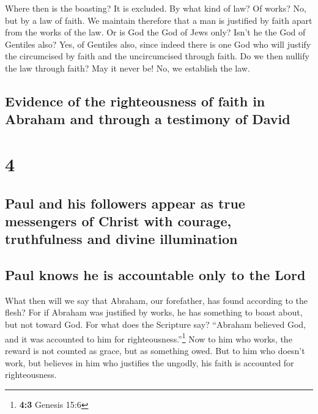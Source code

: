  Where then is the boasting? It is excluded. By what kind
of law? Of works? No, but by a law of faith.  We maintain
therefore that a man is justified by faith apart from the works of the
law.  Or is God the God of Jews only? Isn't he the God of
Gentiles also? Yes, of Gentiles also,  since indeed there
is one God who will justify the circumcised by faith and the
uncircumcised through faith.  Do we then nullify the law
through faith? May it never be! No, we establish the law.

\hypertarget{evidence-of-the-righteousness-of-faith-in-abraham-and-through-a-testimony-of-david}{%
\subsection{Evidence of the righteousness of faith in Abraham and
through a testimony of
David}\label{evidence-of-the-righteousness-of-faith-in-abraham-and-through-a-testimony-of-david}}

\hypertarget{section-3}{%
\section{4}\label{section-3}}

\hypertarget{paul-and-his-followers-appear-as-true-messengers-of-christ-with-courage-truthfulness-and-divine-illumination}{%
\subsection{Paul and his followers appear as true messengers of Christ
with courage, truthfulness and divine
illumination}\label{paul-and-his-followers-appear-as-true-messengers-of-christ-with-courage-truthfulness-and-divine-illumination}}

\hypertarget{paul-knows-he-is-accountable-only-to-the-lord}{%
\subsection{Paul knows he is accountable only to the
Lord}\label{paul-knows-he-is-accountable-only-to-the-lord}}

 What then will we say that Abraham, our forefather, has
found according to the flesh?  For if Abraham was
justified by works, he has something to boast about, but not toward God.
 For what does the Scripture say? ``Abraham believed God,
and it was accounted to him for righteousness.''\footnote{\textbf{4:3}
  Genesis 15:6}  Now to him who works, the reward is not
counted as grace, but as something owed.  But to him who
doesn't work, but believes in him who justifies the ungodly, his faith
is accounted for righteousness.


